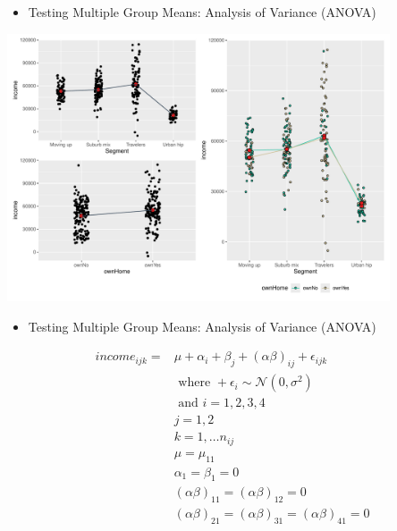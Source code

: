 \documentclass[
  ignorenonframetext,
]{beamer}
\providecommand{\tightlist}{%
  \setlength{\itemsep}{0pt}\setlength{\parskip}{0pt}}\usepackage{longtable,booktabs,array}
\begin{document}
\begin{frame}{}
\label{section-31}
\begin{itemize}
\tightlist
\item
  Testing Multiple Group Means: Analysis of Variance (ANOVA)
\end{itemize}

\begin{center}
\includegraphics[width=0.85\textwidth,height=\textheight]{006_comparing_groups_statistical_tests_files/figure-beamer/unnamed-chunk-30-1.pdf}
\end{center}
\end{frame}

\begin{frame}{}
\label{section-32}
\begin{itemize}
\tightlist
\item
  Testing Multiple Group Means: Analysis of Variance (ANOVA)
\end{itemize}

\footnotesize

\[\begin{split}
  income_{ijk} =  & \mu + \alpha_i + \beta_j + (\alpha\beta)_{ij} + \epsilon_{ijk} \\ 
  & \text{ where } + \epsilon_i \sim \mathcal{N}(0, \sigma^2) \\ 
  & \text{ and } i = 1, 2, 3, 4 \\
  & j = 1, 2 \\
  & k = 1, \ldots n_{ij} \\
  & \mu = \mu_{11} \\
  & \alpha_1 = \beta_1 = 0 \\
  & (\alpha\beta)_{11} = (\alpha\beta)_{12} = 0 \\ 
  & (\alpha\beta)_{21} = (\alpha\beta)_{31} = (\alpha\beta)_{41} = 0 \\  
  \end{split}\]
\end{frame}
\end{document}
